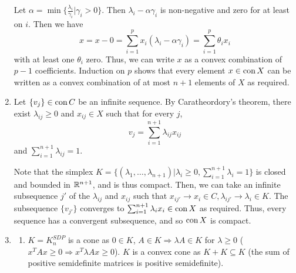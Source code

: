 \begin{enumerate}[label*=Ex \arabic*.]
  Let $\alpha = \min \{ \frac{\lambda_{i}}{\gamma_{i}} | \gamma_{i} >
  0 \}$. Then $\lambda_{i} - \alpha \gamma_{i}$ is non-negative and
  zero for at least on $i$. Then we have
  \begin{equation}
    \label{eq:28}
    x = x - 0 = \sum_{i=1}^{p} x_{i} (\lambda_{i} - \alpha
    \gamma_{i}) = \sum_{i=1}^{p} \theta_{i} x_{i}  
  \end{equation}
  with at least one $\theta_{i}$ zero. Thus, we can write $x$ as a
  convex combination of $p - 1$ coefficients. Induction on $p$ shows
  that every element $x \in \operatorname*{con} X$ can be written as a convex
  combination of at most $n+1$ elements of $X$ as required.
\item \label{item:9} Let $\{ v_{j} \} \in \operatorname*{con} C$ be an infinite
  sequence. By Caratheordory's theorem, there exist $\lambda_{ij} \geq
  0$ and $x_{ij} \in X$ such that for every $j$,
  \begin{equation}
    \label{eq:3}
    v_{j} = \sum_{i=1}^{n+1} \lambda_{ij} x_{ij}
  \end{equation} and $\sum_{i=1}^{n+1} \lambda_{ij} = 1$.

  Note that the simplex $K = \{ (\lambda_{1}, \dots, \lambda_{n+1}) |
  \lambda_{i} \geq 0, \sum_{i=1}^{n+1} \lambda_{i} = 1 \}$ is closed
  and bounded in $\mathbb{R}^{n+1}$, and is thus compact. Then, we can take an
  infinite subsequence $j'$ of the $\lambda_{ij}$ and $x_{ij}$ such
  that $x_{ij'} \rightarrow x_{i} \in C, \lambda_{ij'} \rightarrow
  \lambda_{i} \in K$. The subsequence $\{ v_{j'} \}$ converges to
  $\sum_{i=1}^{n+1} \lambda_{i} x_{i} \in \operatorname*{con} X$ as required. Thus,
  every sequence has a convergent subsequence, and so $\operatorname*{con} X$ is
  compact.
\item \label{item:10}
  \begin{enumerate}
  \item $K = K_{n}^{SDP}$ is a cone as $0 \in K$, $A \in K \Rightarrow \lambda A \in
    K$ for $\lambda \geq 0$ ($x^{T}Ax \geq 0 \Rightarrow x^{T} \lambda
    A x \geq 0$). $K$ is a convex cone as $K + K \subseteq K$ (the sum of
    positive semidefinite matrices is positive semidefinite).


\end{enumerate}
\end{enumerate}
